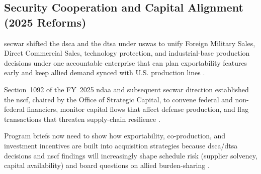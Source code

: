 \documentclass[../main.tex]{subfiles}
\begin{document}
\subsection{Security Cooperation and Capital Alignment (2025 Reforms)}
\begin{description}[style=nextline,labelsep=0.5em,font=\bfseries]
  \item[\textbf{Arms-transfer realignment.}] \ac{secwar} shifted the \ac{dsca} and the \ac{dtsa} under \ac{uswas} to unify Foreign Military Sales, Direct Commercial Sales, technology protection, and industrial-base production decisions under one accountable enterprise that can plan exportability features early and keep allied demand synced with U.S. production lines \autocite{secwar-arms-transfer-2025}.
  \item[\textbf{National Security Capital Forum.}] Section~1092 of the FY~2025 \ac{ndaa} and subsequent \ac{secwar} direction established the \ac{nscf}, chaired by the Office of Strategic Capital, to convene federal and non-federal financiers, monitor capital flows that affect defense production, and flag transactions that threaten supply-chain resilience \autocite{secwar-nscf-2025}.
  \item[\textbf{\ac{edo} relevance.}] Program briefs now need to show how exportability, co-production, and investment incentives are built into acquisition strategies because \ac{dsca}/\ac{dtsa} decisions and \ac{nscf} findings will increasingly shape schedule risk (supplier solvency, capital availability) and board questions on allied burden-sharing \autocite{secwar-arms-transfer-2025,secwar-nscf-2025}.
\end{description}
\end{document}
